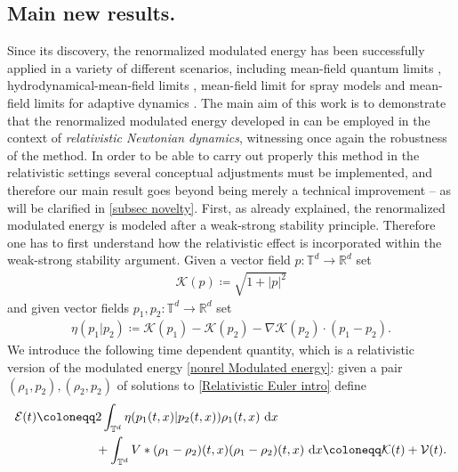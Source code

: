 \documentclass[11pt,reqno]{amsart}
\numberwithin{equation}{section}
\def\dd{{\rm d}}
\begin{document}
\subsection{Main new results.} Since its discovery, the renormalized modulated energy has been successfully  applied in a variety of different scenarios, including mean-field quantum limits \cite{golse2012mean}, hydrodynamical-mean-field limits \cite{han2021newton, rosenzweig2023rigorous}, mean-field limit for spray models \cite{menard2024mean} and mean-field limits for adaptive dynamics \cite{ben2026singular}.
The main aim of this work is to demonstrate that the renormalized modulated energy   developed in \cite{duerinckx2020mean} can be employed in the context of \textit{relativistic Newtonian dynamics}, witnessing once again the robustness of the method. In order to be able to carry out properly this method in the relativistic settings several conceptual adjustments must be implemented, and therefore our main result goes beyond being merely a technical improvement -- as will be clarified in \ref{subsec novelty}. First, as already explained, the renormalized modulated energy is modeled after a weak-strong stability principle. Therefore one has to first understand how the relativistic effect is incorporated within the weak-strong stability argument.
Given a vector field $p:\mathbb{T}^{d}\rightarrow \mathbb{R}^{d}$ set
\begin{align}
 \mathscr{K}(p)\coloneqq\sqrt{1+\left\vert p\right\vert^{2}}\label{def of rel kinetic part}   
\end{align}
and given vector fields $p_{1},p_{2}:\mathbb{T}^{d}\rightarrow \mathbb{R}^{d}$ set 
\begin{align}
\eta(p_{1}\vert p_{2})\coloneqq\mathscr{K}(p_{1})-\mathscr{K}(p_{2})-\nabla \mathscr{K}(p_{2})\cdot (p_{1}-p_{2}). \label{definition of eta intro}     
\end{align}
We introduce the following time dependent quantity, which is a relativistic version of the modulated energy \eqref{nonrel Modulated energy}: 
given a pair $(\rho_{1},p_{2}),(\rho_{2},p_{2})$ of solutions to \eqref{Relativistic Euler intro} define  
\begin{align}
\mathcal{E}(t)\coloneqq &2\int_{\mathbb{T}^{d}}\eta(p_{1}(t,x)\vert p_{2}(t,x))\rho_{1}(t,x)\ \dd x \notag\\
&+\int_{\mathbb{T}^{d}}V\ast (\rho_{1}-\rho_{2})(t,x)(\rho_{1}-\rho_{2})(t,x)\ \dd x \coloneqq\mathcal{K}(t)+\mathcal{V}(t). \label{rel modulated energy intro}   
\end{align}
\end{document}
